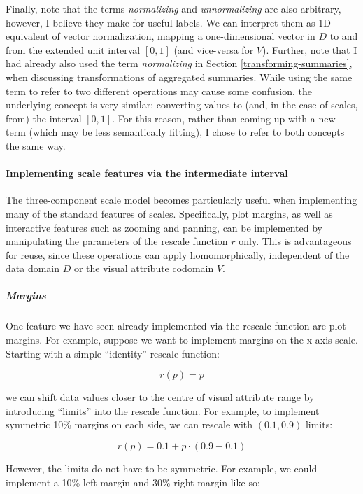 \documentclass[
  openany]{book}
\theoremstyle{definition}
\theoremstyle{definition}
\theoremstyle{definition}
\theoremstyle{definition}
\theoremstyle{remark}
\begin{document}
Finally, note that the terms \emph{normalizing} and \emph{unnormalizing} are also arbitrary, however, I believe they make for useful labels. We can interpret them as 1D equivalent of vector normalization, mapping a one-dimensional vector in \(D\) to and from the extended unit interval \([0, 1]\) (and vice-versa for \(V\)). Further, note that I had already also used the term \emph{normalizing} in Section \ref{transforming-summaries}, when discussing transformations of aggregated summaries. While using the same term to refer to two different operations may cause some confusion, the underlying concept is very similar: converting values to (and, in the case of scales, from) the interval \([0, 1]\). For this reason, rather than coming up with a new term (which may be less semantically fitting), I chose to refer to both concepts the same way.

\paragraph{Implementing scale features via the intermediate interval}\label{implementing-scale-features-via-the-intermediate-interval}

The three-component scale model becomes particularly useful when implementing many of the standard features of scales. Specifically, plot margins, as well as interactive features such as zooming and panning, can be implemented by manipulating the parameters of the rescale function \(r\) only. This is advantageous for reuse, since these operations can apply homomorphically, independent of the data domain \(D\) or the visual attribute codomain \(V\).

\subparagraph{Margins}\label{margins}

One feature we have seen already implemented via the rescale function are plot margins. For example, suppose we want to implement margins on the x-axis scale. Starting with a simple ``identity'' rescale function:

\[r(p) = p\]

we can shift data values closer to the centre of visual attribute range by introducing ``limits'' into the rescale function. For example, to implement symmetric 10\% margins on each side, we can rescale with \((0.1, 0.9)\) limits:

\[r(p) = 0.1 + p \cdot (0.9 - 0.1)\]

However, the limits do not have to be symmetric. For example, we could implement a 10\% left margin and 30\% right margin like so:
\end{document}
